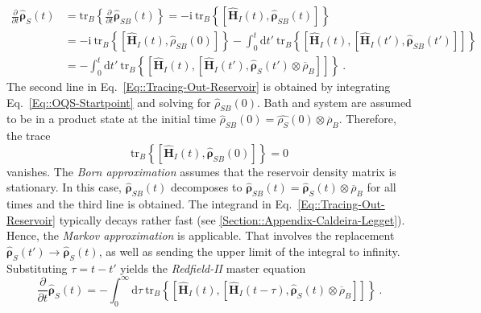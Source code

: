 	\begin{equation} \label{Eq::Tracing-Out-Reservoir}
		\begin{split}
			\frac{\partial}{\partial t} \boldsymbol{\hat{\rho}}_S(t) &=	\text{tr}_B \left \lbrace \frac{\partial}{\partial t} \boldsymbol{\hat{\rho}}_{SB}(t) \right \rbrace =	-\mathrm{i}~\text{tr}_B \left\lbrace \left[\boldsymbol{\hat{H}}_I(t), \boldsymbol{\hat{\rho}}_{SB}(t)\right] \right\rbrace  \\
			&=	-\mathrm{i}~\text{tr}_B \left\lbrace \left[\boldsymbol{\hat{H}}_I(t), {\hat{\rho}}_{SB}(0)\right] \right \rbrace - \int_{0}^{t} \text{d}t'~ \text{tr}_B \left\{  \left[\boldsymbol{\hat{H}}_I(t), \left[\boldsymbol{\hat{H}}_I(t'), \boldsymbol{\hat{\rho}}_{SB}(t') \right]\right]  \right\} \\
			&=- \int_{0}^{t} \text{d}t'~ \text{tr}_B \left\{  \left[\boldsymbol{\hat{H}}_I(t), \left[\boldsymbol{\hat{H}}_I(t'), \boldsymbol{\hat{\rho}}_S(t') \otimes \overline{\rho}_B \right]\right]  \right\}~.
		\end{split}
	\end{equation}
	The second line in Eq.~\eqref{Eq::Tracing-Out-Reservoir} is obtained by integrating Eq.~\eqref{Eq::OQS-Startpoint} and solving for ${\hat{\rho}}_{SB}(0)$. Bath and system are assumed to be in a product state at the initial time ${\hat{\rho}}_{SB}(0) =	\hat{\rho_S}(0) \otimes \overline{\rho}_B$. Therefore, the trace
		\begin{equation}
		\text{tr}_B \left\lbrace \left[\boldsymbol{\hat{H}}_I(t), \boldsymbol{\hat{\rho}}_{SB}(0)\right] \right \rbrace =	0
	\end{equation}
	vanishes. The \textit{Born approximation} assumes that the reservoir density matrix is stationary. In this case, $\boldsymbol{\hat{\rho}}_{SB}(t)$ decomposes to $\boldsymbol{\hat{\rho}}_{SB}(t) = \boldsymbol{\hat{\rho}}_S(t) \otimes \overline{\rho}_B$ for all times and the third line is obtained. The integrand in  Eq.~\eqref{Eq::Tracing-Out-Reservoir} typically decays rather fast (see \autoref{Section::Appendix-Caldeira-Legget}). Hence, the \textit{Markov approximation} \cite{landi2022nonequilibrium} is applicable. That involves the replacement $\boldsymbol{\hat{\rho}}_S(t') \rightarrow \boldsymbol{\hat{\rho}}_S(t)$, as well as  sending the upper limit of the integral to infinity. Substituting $\tau =t - t'$ yields the \textit{Redfield-II} master equation
	\begin{equation} \label{Eq::Redfield-II}
		\frac{\partial}{\partial t} \boldsymbol{\hat{\rho}}_S(t) = - \int_{0}^{\infty} \text{d}\tau~ \text{tr}_B \left\{  \left[\boldsymbol{\hat{H}}_I(t), \left[\boldsymbol{\hat{H}}_I(t - \tau), \boldsymbol{\hat{\rho}}_S(t) \otimes \overline{\rho}_B \right]\right]  \right\} ~.
	\end{equation}
